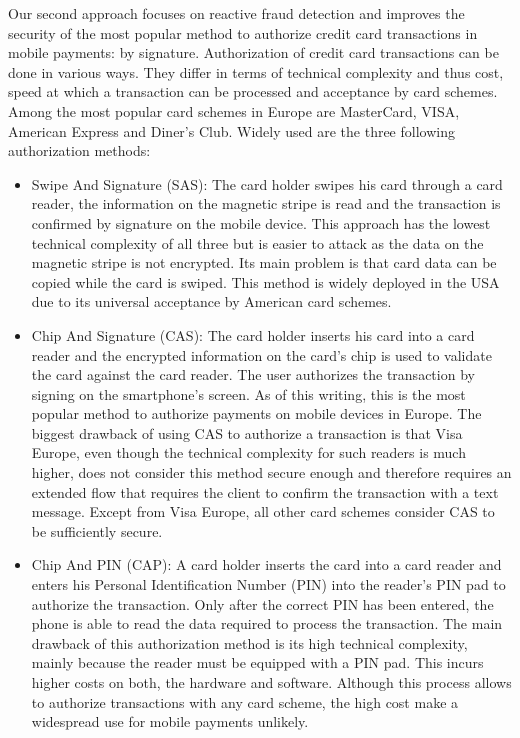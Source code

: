 \documentclass[a4paper, oneside]{csthesis}
\begin{document}
Our second approach focuses on reactive fraud detection and improves the security of the most popular method to authorize credit card transactions in mobile payments: by signature.
Authorization of credit card transactions can be done in various ways. They differ in terms of technical complexity and thus cost, speed at which a transaction can be processed and acceptance by card schemes. Among the most popular card schemes in Europe are MasterCard, VISA, American Express and Diner's Club. Widely used are the three following authorization methods:

\begin{itemize}
\item Swipe And Signature (SAS): The card holder swipes his card through a card reader, the information on the magnetic stripe is read and the transaction is confirmed by signature on the mobile device. This approach has the lowest technical complexity of all three but is easier to attack as the data on the magnetic stripe is not encrypted. Its main problem is that card data can be copied while the card is swiped. This method is widely deployed in the USA due to its universal acceptance by American card schemes.

\item Chip And Signature (CAS): The card holder inserts his card into a card reader and the encrypted information on the card's chip is used to validate the card against the card reader. The user authorizes the transaction by signing on the smartphone's screen. As of this writing, this is the most popular method to authorize payments on mobile devices in Europe. The biggest drawback of using CAS to authorize a transaction is that Visa Europe, even though the technical complexity for such readers is much higher, does not consider this method secure enough and therefore requires an extended flow that requires the client to confirm the transaction with a text message. Except from Visa Europe, all other card schemes consider CAS to be sufficiently secure.

\item Chip And PIN (CAP): A card holder inserts the card into a card reader and enters his Personal Identification Number (PIN) into the reader's PIN pad to authorize the transaction. Only after the correct PIN has been entered, the phone is able to read  the data required to process the transaction. The main drawback of this authorization method is its high technical complexity, mainly because the reader must be equipped with a PIN pad. This incurs higher costs on both, the hardware and software. Although this process allows to authorize transactions with any card scheme, the high cost make a widespread use for mobile payments unlikely.
\end{itemize}
\end{document}
